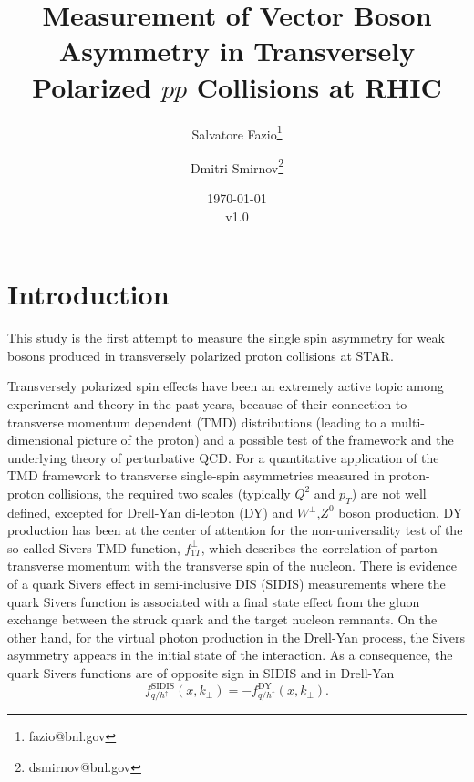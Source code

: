 \documentclass[12pt]{article}
\begin{document}
\setcounter{section}{0}
\setcounter{subsection}{0}
\setcounter{equation}{0}
\setcounter{figure}{0}
\setcounter{footnote}{0}
\setcounter{table}{0}

\title{Measurement of Vector Boson Asymmetry in Transversely Polarized $pp$
Collisions at RHIC}

\author{Salvatore Fazio\thanks{fazio@bnl.gov}}
\author{Dmitri Smirnov\thanks{dsmirnov@bnl.gov}}

\date{\today\\v1.0}

\maketitle

\newpage
\tableofcontents 

\newpage
\linenumbers


\section{Introduction}

This study is the first attempt to measure the single spin asymmetry for weak bosons produced
in transversely polarized proton collisions at STAR. 

Transversely polarized spin effects have been an extremely active topic among experiment and theory in the past years, because of their connection to transverse momentum dependent (TMD) distributions (leading to a multi-dimensional picture of the proton) and a possible test of the framework and the underlying theory of perturbative QCD. For a quantitative application of the TMD framework to transverse single-spin asymmetries measured in proton-proton collisions, the required two scales (typically $Q^{2}$ and $p_{T}$) are not well defined, excepted for Drell-Yan di-lepton (DY) and $W^{\pm}$,$Z^{0}$ boson production. DY production has been at the center of attention for the non-universality test of the so-called Sivers TMD function, %
$f^{\perp}_{1T}$, which describes the correlation of parton transverse momentum with the transverse spin of the nucleon.  There is evidence of a quark Sivers effect in semi-inclusive DIS (SIDIS) measurements where the quark Sivers function is associated with a final state effect from the gluon exchange between the struck quark and the target nucleon remnants. On the other hand, for the virtual photon production in the Drell-Yan process, the Sivers asymmetry appears in the initial state of the interaction. As a consequence, the quark Sivers functions are of opposite sign in SIDIS and in Drell-Yan
%
\begin{equation}
f^\text{SIDIS}_{q/h^\uparrow} (x, k_\perp) = - f^\text{DY}_{q/h^\uparrow} (x, k_\perp).
\end{equation}
\end{document}
